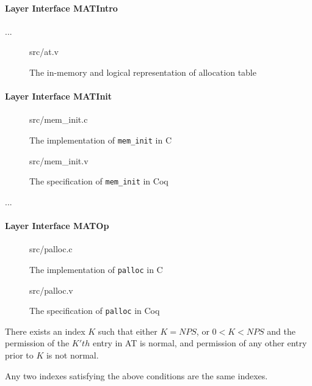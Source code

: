 \paragraph{Layer Interface MATIntro}
...


\begin{figure}
	 {src/at.v}
	\caption{The in-memory and logical representation of allocation table}
	\label{fig:at_v}
\end{figure}

\paragraph{Layer Interface MATInit}

\begin{figure}
	 {src/mem_init.c}
	\caption{The implementation of \texttt{mem\_init} in C}
	\label{fig:mem_init_c}
\end{figure}


\begin{figure}
	 {src/mem_init.v}
	\caption{The specification of \texttt{mem\_init} in Coq}
	\label{fig:mem_init_v}
\end{figure}

...

\paragraph{Layer Interface MATOp}

\begin{figure}
	 {src/palloc.c}
	\caption{The implementation of \texttt{palloc} in C}
	\label{fig:palloc_c}
\end{figure}

\begin{figure}
	 {src/palloc.v}
	\caption{The specification of \texttt{palloc} in Coq}
	\label{fig:palloc_v}
\end{figure}

\begin{lemma}[Termination] There exists an index $K$ such that either $K=NPS$, or $0<K<NPS$ and the permission of the $K'th$ entry
in AT is normal, and permission of any other entry prior to $K$ is not normal.
\end{lemma}

\begin{lemma} [Unique] Any two indexes satisfying the above conditions are the same indexes.
\end{lemma}

